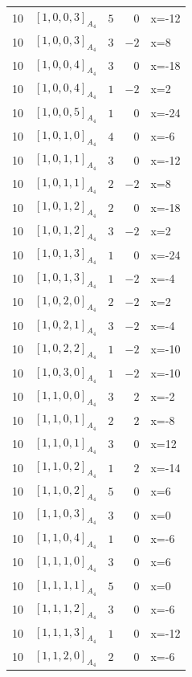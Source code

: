\documentclass[11pt]{article}
\newcommand{\Dynkin}[1]{#1}
\begin{document}
\begin{longtable}{r l r r l}
10 & $\Dynkin{[1,0,0,3]_{A_4}}$ & $5$ & $0$ & x=-12\\
10 & $\Dynkin{[1,0,0,3]_{A_4}}$ & $3$ & $-2$ & x=8\\
10 & $\Dynkin{[1,0,0,4]_{A_4}}$ & $3$ & $0$ & x=-18\\
10 & $\Dynkin{[1,0,0,4]_{A_4}}$ & $1$ & $-2$ & x=2\\
10 & $\Dynkin{[1,0,0,5]_{A_4}}$ & $1$ & $0$ & x=-24\\
10 & $\Dynkin{[1,0,1,0]_{A_4}}$ & $4$ & $0$ & x=-6\\
10 & $\Dynkin{[1,0,1,1]_{A_4}}$ & $3$ & $0$ & x=-12\\
10 & $\Dynkin{[1,0,1,1]_{A_4}}$ & $2$ & $-2$ & x=8\\
10 & $\Dynkin{[1,0,1,2]_{A_4}}$ & $2$ & $0$ & x=-18\\
10 & $\Dynkin{[1,0,1,2]_{A_4}}$ & $3$ & $-2$ & x=2\\
10 & $\Dynkin{[1,0,1,3]_{A_4}}$ & $1$ & $0$ & x=-24\\
10 & $\Dynkin{[1,0,1,3]_{A_4}}$ & $1$ & $-2$ & x=-4\\
10 & $\Dynkin{[1,0,2,0]_{A_4}}$ & $2$ & $-2$ & x=2\\
10 & $\Dynkin{[1,0,2,1]_{A_4}}$ & $3$ & $-2$ & x=-4\\
10 & $\Dynkin{[1,0,2,2]_{A_4}}$ & $1$ & $-2$ & x=-10\\
10 & $\Dynkin{[1,0,3,0]_{A_4}}$ & $1$ & $-2$ & x=-10\\
10 & $\Dynkin{[1,1,0,0]_{A_4}}$ & $3$ & $2$ & x=-2\\
10 & $\Dynkin{[1,1,0,1]_{A_4}}$ & $2$ & $2$ & x=-8\\
10 & $\Dynkin{[1,1,0,1]_{A_4}}$ & $3$ & $0$ & x=12\\
10 & $\Dynkin{[1,1,0,2]_{A_4}}$ & $1$ & $2$ & x=-14\\
10 & $\Dynkin{[1,1,0,2]_{A_4}}$ & $5$ & $0$ & x=6\\
10 & $\Dynkin{[1,1,0,3]_{A_4}}$ & $3$ & $0$ & x=0\\
10 & $\Dynkin{[1,1,0,4]_{A_4}}$ & $1$ & $0$ & x=-6\\
10 & $\Dynkin{[1,1,1,0]_{A_4}}$ & $3$ & $0$ & x=6\\
10 & $\Dynkin{[1,1,1,1]_{A_4}}$ & $5$ & $0$ & x=0\\
10 & $\Dynkin{[1,1,1,2]_{A_4}}$ & $3$ & $0$ & x=-6\\
10 & $\Dynkin{[1,1,1,3]_{A_4}}$ & $1$ & $0$ & x=-12\\
10 & $\Dynkin{[1,1,2,0]_{A_4}}$ & $2$ & $0$ & x=-6\\

\end{longtable}
\end{document}
